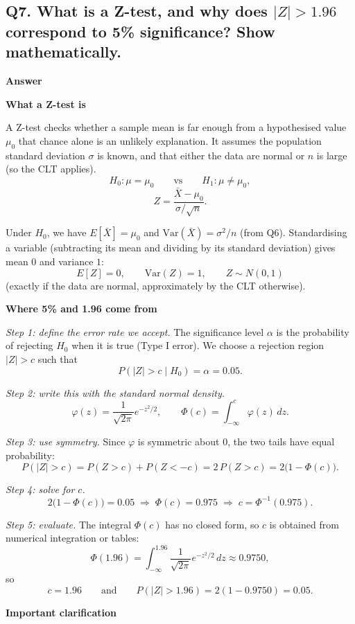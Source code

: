 \documentclass[11pt]{article}
\begin{document}
\subsection*{Q7. What is a Z-test, and why does \(|Z|>1.96\) correspond to 5\% significance? Show mathematically.}

\textbf{Answer}

\textbf{What a Z-test is}

A Z-test checks whether a sample mean is far enough from a hypothesised value \(\mu_0\) that chance alone is an unlikely explanation. It assumes the population standard deviation \(\sigma\) is known, and that either the data are normal or \(n\) is large (so the CLT applies).
\[
H_0:\mu=\mu_0
\qquad\text{vs}\qquad
H_1:\mu\neq\mu_0,
\]
\[
Z=\frac{\bar X-\mu_0}{\sigma/\sqrt n}.
\]

Under \(H_0\), we have \(E[\bar X]=\mu_0\) and \(\mathrm{Var}(\bar X)=\sigma^2/n\) (from Q6). Standardising a variable (subtracting its mean and dividing by its standard deviation) gives mean \(0\) and variance \(1\):
\[
E[Z]=0,\qquad \mathrm{Var}(Z)=1,\qquad Z\sim N(0,1)
\]
(exactly if the data are normal, approximately by the CLT otherwise).

\textbf{Where 5\% and 1.96 come from}

\emph{Step 1: define the error rate we accept.} The significance level \(\alpha\) is the probability of rejecting \(H_0\) when it is true (Type I error). We choose a rejection region \(|Z|>c\) such that
\[
P(|Z|>c\mid H_0)=\alpha=0.05.
\]

\emph{Step 2: write this with the standard normal density.}
\[
\varphi(z)=\frac{1}{\sqrt{2\pi}}e^{-z^{2}/2},
\qquad
\Phi(c)=\int_{-\infty}^{c}\varphi(z)\,dz.
\]

\emph{Step 3: use symmetry.} Since \(\varphi\) is symmetric about \(0\), the two tails have equal probability:
\[
P(|Z|>c)=P(Z>c)+P(Z<-c)=2\,P(Z>c)=2\big(1-\Phi(c)\big).
\]

\emph{Step 4: solve for \(c\).}
\[
2\big(1-\Phi(c)\big)=0.05
\;\Longrightarrow\;
\Phi(c)=0.975
\;\Longrightarrow\;
c=\Phi^{-1}(0.975).
\]

\emph{Step 5: evaluate.} The integral \(\Phi(c)\) has no closed form, so \(c\) is obtained from numerical integration or tables:
\[
\Phi(1.96)=\int_{-\infty}^{1.96}\frac{1}{\sqrt{2\pi}}e^{-z^{2}/2}\,dz\approx 0.9750,
\]
so
\[
\boxed{c=1.96}
\qquad\text{and}\qquad
P(|Z|>1.96)=2(1-0.9750)=0.05.
\]

\textbf{Important clarification}
\end{document}
